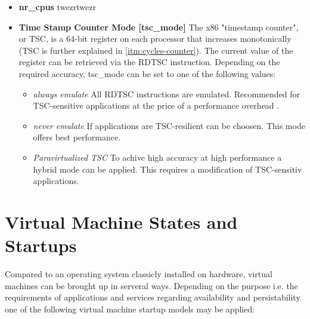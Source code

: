 \begin{itemize}
	\item \textbf{nr\_cpus} twezrtwezr 
	\item \textbf{Time Stamp Counter Mode [\textsf{tsc\_mode}]} The x86 "timestamp counter", or TSC, is a 64-bit register on each processor that increases monotonically \cite{xentscmode} (TSC is further explained in \ref{itm:cycles-counter}). The current value of the register can be retrieved via the \textsf{RDTSC} instruction. Depending on the required accuracy, \textsf{tsc\_mode} can be set to one of the following values:
	\begin{itemize}
		\item \textit{always emulate} All \textsf{RDTSC} instructions are emulated. Recommended for TSC-sensitive applications at the price of a performance overhead \cite{xentscmode}.
		\item \textit{never emulate} If applications are TSC-resilient can be choosen. This mode offers best performance.
		\item \textit{Paravirtualized TSC} To achive high accuracy at high performance a hybrid mode can be applied. This requires a modification of TSC-sensitiv applications.
	\end{itemize}
\end{itemize}


\section{Virtual Machine States and Startups}
Compared to an operating system classicly installed on hardware, virtual machines can be brought up in serveral ways. Depending on the purpose i.e. the requirements of applications and services regarding availability and persistability one of the following virtual machine startup models may be applied:

